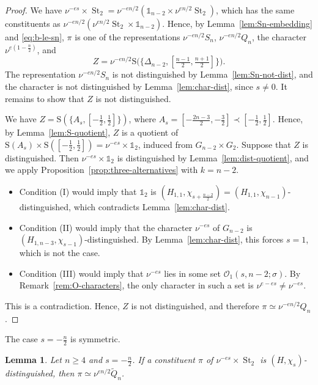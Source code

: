 \documentclass[11pt]{amsart}
\numberwithin{equation}{section}
\theoremstyle{plain}
\newtheorem{lemma}[theorem]{Lemma}
\theoremstyle{definition}
\theoremstyle{remark}
\newcommand{\one}{\mathds{1}}
\DeclareMathOperator{\St}{St}
\newcommand{\Qt}{\widetilde{Q}}
\newcommand{\Ss}{\mathrm{S}}
\begin{document}
\begin{proof}
	We have $\nu^{-es}\times\St_2=\nu^{-en/2}(\one_{n-2}\times\nu^{en/2}\St_2)$, which has the same constituents as $\nu^{-en/2}(\nu^{en/2}\St_2\times\one_{n-2})$. Hence, by Lemma~\ref{lem:Sn-embedding} and \eqref{eq:b-le-sn}, $\pi$ is one of the representations $\nu^{-en/2}S_n$, $\nu^{-en/2}Q_n$, the character $\nu^{e(1-\frac n2)}$, and
	$$Z=\nu^{-en/2}\Ss\big(\{\Delta_{n-2},[\tfrac{n-1}2,\tfrac{n+1}2]\}\big).$$
	The representation $\nu^{-en/2}S_n$ is not distinguished by Lemma~\ref{lem:Sn-not-dist}, and the character is not distinguished by Lemma~\ref{lem:char-dist}, since $s\ne0$. It remains to show that $Z$ is not distinguished.
	
	We have $Z=\Ss(\{A_s,[-\frac12,\frac12]\})$, where $A_s=[-\frac{2n-3}2,-\frac32]\prec[-\frac12,\frac12]$. Hence, by Lemma~\ref{lem:S-quotient}, $Z$ is a quotient of $\Ss(A_s)\times\Ss([-\frac12,\frac12])=\nu^{-es}\times\one_2$, induced from $G_{n-2}\times G_2$. Suppose that $Z$ is distinguished. Then $\nu^{-es}\times\one_2$ is distinguished by Lemma~\ref{lem:dist-quotient}, and we apply Proposition~\ref{prop:three-alternatives} with $k=n-2$.
	\begin{itemize}
		\item Condition (I) would imply that $\one_2$ is $(H_{1,1},\chi_{s+\frac{n-2}2})=(H_{1,1},\chi_{n-1})$-distinguished, which contradicts Lemma~\ref{lem:char-dist}.
		\item Condition (II) would imply that the character $\nu^{-es}$ of $G_{n-2}$ is $(H_{1,n-3},\chi_{s-1})$-distinguished. By Lemma~\ref{lem:char-dist}, this forces $s=1$, which is not the case.
		\item Condition (III) would imply that $\nu^{-es}$ lies in some set $\mathcal O_1(s,n-2;\sigma)$. By Remark~\ref{rem:O-characters}, the only character in such a set is $\nu^{e-es}\ne\nu^{-es}$.
	\end{itemize}
	This is a contradiction. Hence, $Z$ is not distinguished, and therefore $\pi\simeq\nu^{-en/2}Q_n$.
\end{proof}

The case $s=-\frac n2$ is symmetric.

\begin{lemma}\label{lem:constituents-St2-minus}
	Let $n\ge4$ and $s=-\frac n2$. If a constituent $\pi$ of $\nu^{-es}\times\St_2$ is $(H,\chi_s)$-distinguished, then $\pi\simeq\nu^{en/2}\Qt_n$.
\end{lemma}
\end{document}
